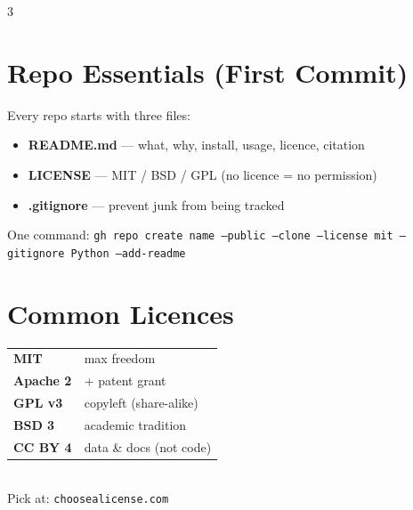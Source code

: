 \documentclass[10pt, a4paper, landscape]{article}
\begin{document}
\begin{multicols}{3}
\section{Repo Essentials (First Commit)}
Every repo starts with three files:
\begin{itemize}
  \item \textbf{README.md} --- what, why, install, usage, licence, citation
  \item \textbf{LICENSE} --- MIT / BSD / GPL (no licence = no permission)
  \item \textbf{.gitignore} --- prevent junk from being tracked
\end{itemize}
One command: {\scriptsize\texttt{gh repo create name --public --clone --license mit --gitignore Python --add-readme}}

\section{Common Licences}
\begin{tabular}{@{} l l @{}}
  \textbf{MIT}      & max freedom \\
  \textbf{Apache 2} & + patent grant \\
  \textbf{GPL v3}   & copyleft (share-alike) \\
  \textbf{BSD 3}    & academic tradition \\
  \textbf{CC BY 4}  & data \& docs (not code) \\
\end{tabular}\\[2pt]
Pick at: \texttt{choosealicense.com}

\end{multicols}
\end{document}
